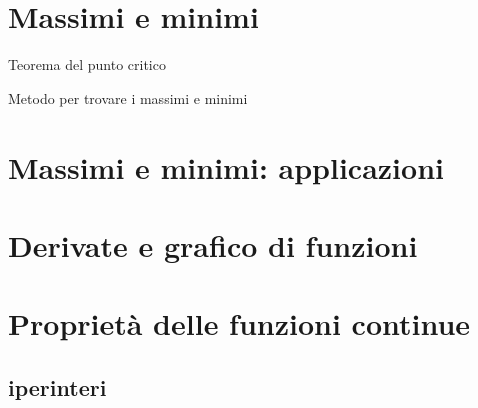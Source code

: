 \section{Massimi e minimi}
\label{sec:cont_massimiminimi}

Teorema del punto critico

Metodo per trovare i massimi e minimi

\section{Massimi e minimi: applicazioni}
\label{sec:cont_applicazioni}

\section{Derivate e grafico di funzioni}
\label{sec:cont_derivate_studiof}

\section{Proprietà delle funzioni continue}
\label{sec:cont_proprieta}

\subsection{iperinteri}
\label{subsec:cont_iperinteri}

